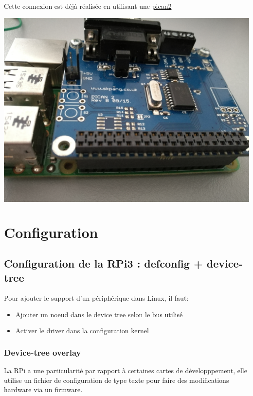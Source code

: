 Cette connexion est déjà réalisée en utilisant une
\href{http://skpang.co.uk/catalog/images/raspberrypi/pi_2/PICAN2UG13.pdf}{pican2}

\begin{centering}
  \includegraphics[height=0.3\textheight]{pictures/04_labs/rpi3_pican.jpg} \\
\end{centering}

\section{Configuration}
\subsection{Configuration de la RPi3 : defconfig + device-tree}

Pour ajouter le support d'un périphérique dans Linux, il faut:
\begin{itemize}
\item Ajouter un noeud dans le device tree selon le bus utilisé
\item Activer le driver dans la configuration kernel
\end{itemize}

\subsubsection{Device-tree overlay}

La RPi a une particularité par rapport à certaines cartes de développpement,
elle utilise un fichier de configuration de type texte pour faire des
modifications hardware via un firmware.

